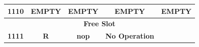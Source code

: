 \documentclass{article}
\begin{document}
\begin{table}[H]
\begin{tabular}{|c|*{4}{c|}}
        \multicolumn{1}{|c|}{\textbf{1110}}   & \multicolumn{1}{c|}{\textbf{EMPTY}} & \multicolumn{1}{c|}{\textbf{EMPTY}}     & \multicolumn{1}{c|}{\textbf{EMPTY}}                     & \multicolumn{1}{c|}{\textbf{EMPTY}}                                            \\ \hline
        \multicolumn{5}{|c|}{\textbf{Free Slot}}                                                                                                                                                                                                                         \\ \hline 
        \multicolumn{1}{|c|}{\textbf{1111}}   & \multicolumn{1}{c|}{\textbf{R}}     & \multicolumn{1}{c|}{\textbf{nop}}       & \multicolumn{1}{c|}{\textbf{No Operation}}              & \multicolumn{1}{c|}{\textbf{}}                                                 \\ \hline
      \end{tabular}
    \end{table}
\end{document}
